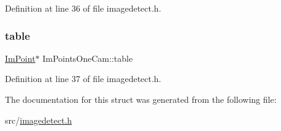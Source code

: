 Definition at line 36 of file imagedetect.\+h.

\mbox{\label{struct_im_points_one_cam_aabcd72a8bb4430c36d3c55116a7b87b5}} 
\subsubsection{\texorpdfstring{table}{table}}
{\footnotesize\ttfamily \mbox{\hyperlink{struct_im_point}{Im\+Point}}$\ast$ Im\+Points\+One\+Cam\+::table}



Definition at line 37 of file imagedetect.\+h.



The documentation for this struct was generated from the following file\+:\begin{DoxyCompactItemize}
\item 
src/\mbox{\hyperlink{imagedetect_8h}{imagedetect.\+h}}\end{DoxyCompactItemize}
